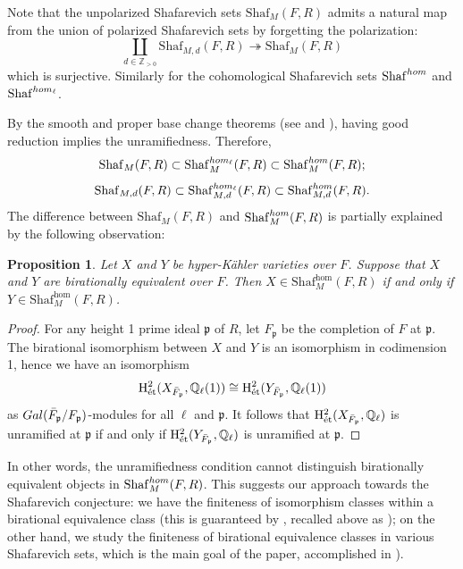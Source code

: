 \documentclass[11pt,reqno,oneside]{amsart}
\numberwithin{equation}{section}
\newtheorem{proposition}[theorem]{Proposition}
\theoremstyle{definition}
\newcommand{\Gal}{{\rm Gal}}
\DeclareMathOperator{\et}{\Acute{e}t}
\renewcommand{\hom}{{\rm hom}}
\newcommand{\Sha}{\mathrm{Shaf}}
\newcommand\rH{\mathrm{H}}
\newcommand{\QQ}{\mathbb{Q}}
\newcommand{\ZZ}{\mathbb{Z}}
\begin{document}
Note that the  unpolarized Shafarevich sets $\Sha_M(F,R)$ admits a natural map from the union of polarized Shafarevich sets by forgetting the polarization: 
	\begin{equation}\label{up=p}
	\coprod\limits_{d \in \ZZ_{>0}}\Sha_{M,d}(F,R) \twoheadrightarrow \Sha_M(F,R)
	\end{equation} 
which is surjective.
Similarly for the cohomological Shafarevich sets $\Sha^{\hom}$ and $\Sha^{\hom_\ell}$.


By the smooth and proper base change theorems (see \cite[Th\'eor\`eme XII.5.1]{SGA4} and \cite[{Tag 0DG2}]{stacks-project}), having good reduction implies the unramifiedness. Therefore,  $$\Sha_M(F,R)\subset \Sha_M^{\hom_\ell}(F,R)\subset \Sha_M^{\hom}(F,R);$$ $$\Sha_{M,d}(F,R)\subset \Sha_{M,d}^{\hom_\ell}(F,R)\subset \Sha_{M,d}^{\hom}(F,R).$$
The difference between $\Sha_M(F,R)$ and $\Sha_M^{\hom}(F,R)$ is partially explained by the following observation:
\begin{proposition}\label{prop:bir-obs}
 Let $X$ and $Y$ be hyper-Kähler varieties over $F$. Suppose that $X$ and $Y$ are birationally equivalent over $F$.  Then $X\in \Sha^\mathrm{hom}_{M}(F,R)$ if and only if $Y\in \Sha^\mathrm{hom}_{M}(F,R)$. 
\end{proposition}

\begin{proof}
For any height 1 prime ideal $\mathfrak{p}$ of $R$, let $F_{\mathfrak{p}}$ be the completion of $F$ at $\mathfrak{p}$.
The birational isomorphism between $X$ and $Y$ is an isomorphism in codimension 1, hence we have an isomorphism 
$$\rH^2_{\et}(X_{\bar{F}_{\mathfrak{p}}},\QQ_\ell(1))\cong \rH^2_{\et}(Y_{\bar{F}_{\mathfrak{p}}},\QQ_\ell(1))$$
as $\Gal(\bar{F}_{\mathfrak{p}}/F_{\mathfrak{p}})$-modules for all $\ell$ and $\mathfrak{p}$.  It follows that  $\rH^2_{\et}(X_{\bar{F}_{\mathfrak{p}}},\QQ_\ell)$  is unramified at $\mathfrak{p}$ if and only if $\rH^2_{\et}(Y_{\bar{F}_{\mathfrak{p}}},\QQ_\ell)$ is unramified at $\mathfrak{p}$. 
\end{proof}

In other words, the unramifiedness condition cannot distinguish birationally equivalent objects in $\Sha_M^{\hom}(F,R)$. This suggests our approach towards the Shafarevich conjecture: we have the finiteness of isomorphism classes within a birational equivalence class (this is guaranteed by \cite{takamatsu21}, recalled above as ); on the other hand, we study the finiteness of birational equivalence classes in various Shafarevich sets, which is the main goal of the paper, accomplished in ).
\end{document}
